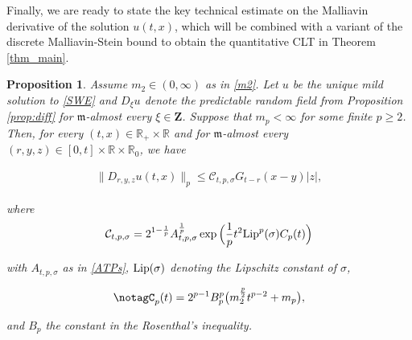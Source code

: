 \documentclass[letterpaper, 11pt,  reqno]{amsart}
\newtheorem{proposition}[theorem]{Proposition}
\newcommand{\noi}{\noindent}
\newcommand{\R}{\mathbb{R}}
\newcommand{\bR}{\mathbb{R}}
\newcommand{\s}{\sigma}
\newcommand{\Lip}{\textup{Lip}}
\newcommand{\fm}{\mathfrak{m}}
\numberwithin{equation}{section}
\numberwithin{theorem}{section}
\begin{document}
 


Finally, we are ready to state the key technical estimate on the Malliavin derivative
of the solution $u(t,x)$, which will be combined with a variant of 
the discrete Malliavin-Stein bound to obtain the quantitative CLT
in Theorem \ref{thm_main}.
 

\begin{proposition}\label{prop_MD}
Assume $m_2\in(0,\infty) $ as in \eqref{m2}.
Let $u$ be the unique mild solution to \eqref{SWE}
and $D_\xi u$ denote the predictable random field from Proposition \ref{prop:diff}
for $\fm$-almost every $\xi\in\mathbf{Z}$.
Suppose that   $m_p < \infty$ for some finite $p\geq 2$.
 Then, for   every $(t,x)\in \bR_{+} \times\R$ and 
 for $\fm$-almost every $(r,y,z)\in [0,t] \times \R \times \R_0$, we have


\noi
\begin{align} \label{Z1}
\| D_{r, y, z} u(t,x) \|_p \leq \mathcal{C}_{t,p, \s}  G_{t-r}(x-y) |z| ,
\end{align}

\noi
where  
\begin{align}
\label{CTPS}
\mathcal{C}_{t,p, \s} = 2^{1-\frac1p}  A_{t,p,\s}^{\frac1p}   
 \exp\Big( \frac{1}{p} t^2 \Lip^p(\s) C_p(t) \Big)
\end{align}

\noi
with $A_{t,p,\s}$ as in  \eqref{ATPs},
 $\textup{Lip}(\s)$ denoting the Lipschitz constant of $\s$, 

\noi
\begin{align}
 \notag%
C_{p}(t)=2^{p-1}B_p^p\big( m_2^{\frac p2} t^{p-2} + m_p \big),
\end{align}

\noi
and  $B_p$ the constant in the  Rosenthal's inequality.



\end{proposition}
\end{document}
